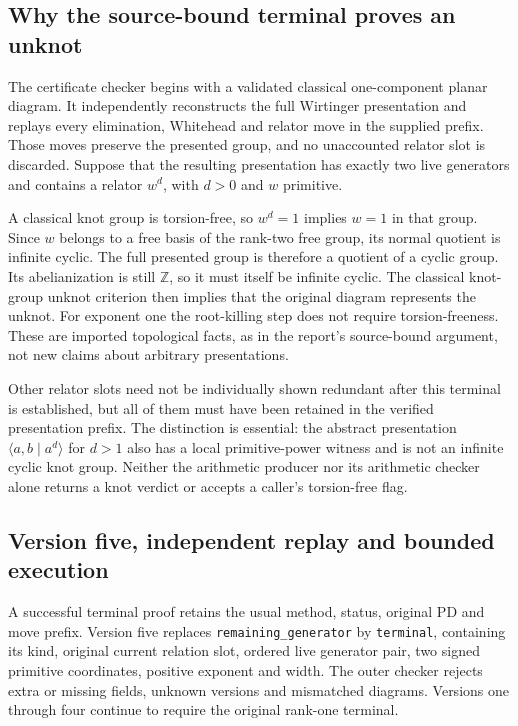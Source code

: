 \subsection{Why the source-bound terminal proves an unknot}

The certificate checker begins with a validated classical one-component
planar diagram. It independently reconstructs the full Wirtinger
presentation and replays every elimination, Whitehead and relator move
in the supplied prefix. Those moves preserve the presented group, and
no unaccounted relator slot is discarded. Suppose that the resulting
presentation has exactly two live generators and contains a relator
$w^d$, with $d>0$ and $w$ primitive.

A classical knot group is torsion-free, so $w^d=1$ implies $w=1$ in that
group. Since $w$ belongs to a free basis of the rank-two free group, its
normal quotient is infinite cyclic. The full presented group is therefore
a quotient of a cyclic group. Its abelianization is still $\mathbb Z$,
so it must itself be infinite cyclic. The classical knot-group unknot
criterion then implies that the original diagram represents the unknot.
For exponent one the root-killing step does not require torsion-freeness.
These are imported topological facts, as in the report's source-bound
argument, not new claims about arbitrary presentations.

Other relator slots need not be individually shown redundant after this
terminal is established, but all of them must have been retained in the
verified presentation prefix. The distinction is essential: the abstract
presentation $\langle a,b\mid a^d\rangle$ for $d>1$ also has a local
primitive-power witness and is not an infinite cyclic knot group.
Neither the arithmetic producer nor its arithmetic checker alone returns
a knot verdict or accepts a caller's torsion-free flag.

\subsection{Version five, independent replay and bounded execution}

A successful terminal proof retains the usual method, status, original PD
and move prefix. Version five replaces \texttt{remaining\_generator} by
\texttt{terminal}, containing its kind, original current relation slot,
ordered live generator pair, two signed primitive coordinates, positive
exponent and width. The outer checker rejects extra or missing fields,
unknown versions and mismatched diagrams. Versions one through four
continue to require the original rank-one terminal.

